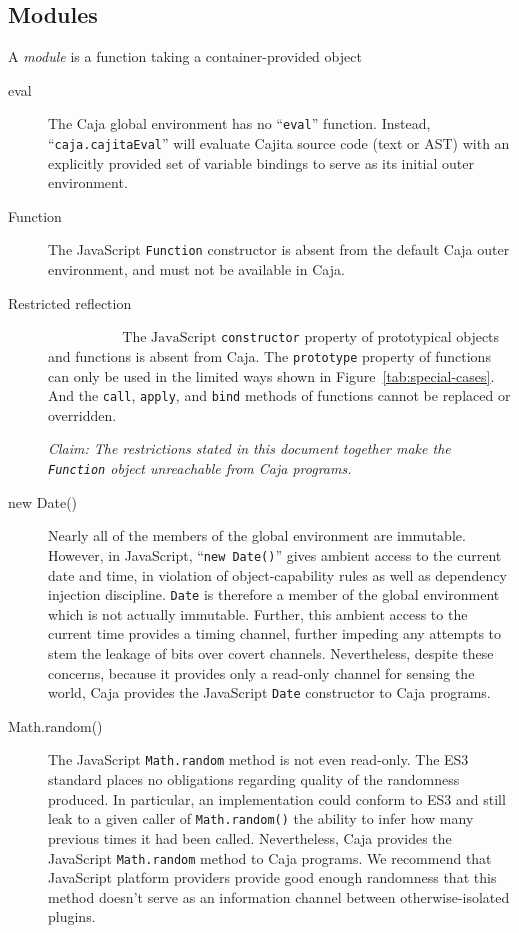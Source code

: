 \documentclass[letterpaper,twocolumn,10pt]{article}
\newcommand{\code}[1]{{\tt {#1}}}              %
\begin{document}
\subsection{Modules}
\label{subsec:outer-env}

A \emph{module} is a function taking a container-provided object 

\begin{description}

    \item[eval] The Caja global environment has no ``\code{eval}'' function. 
    Instead, ``\code{caja.cajitaEval}'' will evaluate Cajita source code (text or 
    AST) with an explicitly provided set of variable bindings to serve as its 
    initial outer environment.
    
    \item[Function] The JavaScript \code{Function} constructor is absent from 
    the default Caja outer environment, and must not be available in Caja.
    
    \item[Restricted reflection] $\mbox{~~~~~~~~~~~~~~~~The JavaScript}$ \code{constructor} property of 
    prototypical objects and functions is absent from Caja. The \code{prototype} property of functions can only be
    used in the limited ways shown in Figure~\ref{tab:special-cases}. And the \code{call}, \code{apply}, and
    \code{bind} methods of functions cannot be replaced or overridden.
    
    \emph{Claim: The restrictions stated in this document together make the 
    \code{Function} object unreachable from Caja programs.}

    \item[new Date()] Nearly all of the members of the global environment
    are immutable.  However, in JavaScript, ``\code{new Date()}''  gives ambient 
    access to the current date and time, in violation of object-capability 
    rules as well as dependency injection discipline. \code{Date} is 
    therefore a member of the global environment which is not actually 
    immutable. Further, this ambient access to the current time provides a 
    timing channel, further impeding any attempts to stem the leakage of bits 
    over covert channels. Nevertheless, despite these concerns, because it 
    provides only a read-only channel for sensing the world, Caja provides 
    the JavaScript \code{Date} constructor to Caja programs.

    \item[Math.random()] The JavaScript \code{Math.random} method is not even 
    read-only. The ES3 standard places no obligations regarding quality of the
    randomness produced. In particular, an implementation could conform to ES3
    and still leak to a given caller of \code{Math.random()} the ability to
    infer how many previous times it had been called. Nevertheless, Caja
    provides the JavaScript \code{Math.random} method to Caja programs. We
    recommend that JavaScript platform providers provide good enough
    randomness that this method doesn't serve as an information channel
    between otherwise-isolated plugins.
    
\end{description}
\end{document}
